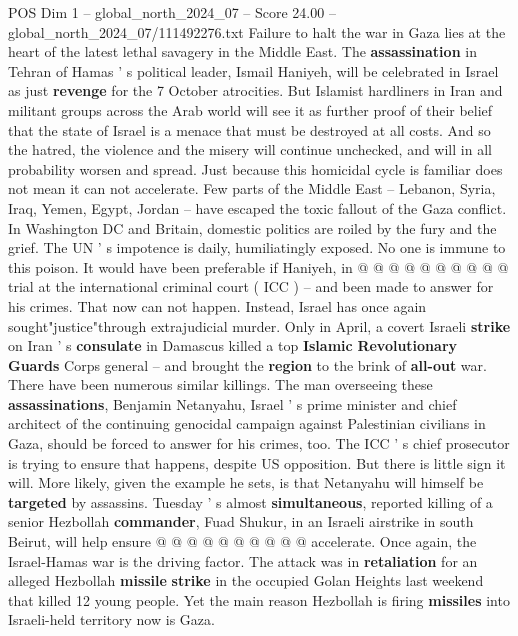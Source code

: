 \begin{textsample}{POS Dim 1 – global\_north\_2024\_07 – Score 24.00 – global\_north\_2024\_07/111492276.txt}  \label{ex:f1_pos_187}
Failure to halt the war in Gaza lies at the heart of the latest lethal savagery in the Middle East.
The \textbf{assassination} in Tehran of Hamas ' s political leader, Ismail Haniyeh, will be celebrated in Israel as just \textbf{revenge} for the 7 October atrocities.
But Islamist hardliners in Iran and militant groups across the Arab world will see it as further proof of their belief that the state of Israel is a menace that must be destroyed at all costs.
And so the hatred, the violence and the misery will continue unchecked, and will in all probability worsen and spread.
Just because this homicidal cycle is familiar does not mean it can not accelerate.
Few parts of the Middle East -- Lebanon, Syria, Iraq, Yemen, Egypt, Jordan -- have escaped the toxic fallout of the Gaza conflict.
In Washington DC and Britain, domestic politics are roiled by the fury and the grief.
The UN ' s impotence is daily, humiliatingly exposed.
No one is immune to this poison.
It would have been preferable if Haniyeh, in @ @ @ @ @ @ @ @ @ @ trial at the international criminal court ( ICC ) -- and been made to answer for his crimes.
That now can not happen.
Instead, Israel has once again sought"justice"through extrajudicial murder.
Only in April, a covert Israeli \textbf{strike} on Iran ' s \textbf{consulate} in Damascus killed a top \textbf{Islamic} \textbf{Revolutionary} \textbf{Guards} Corps general -- and brought the \textbf{region} to the brink of \textbf{all-out} war.
There have been numerous similar killings.
The man overseeing these \textbf{assassinations}, Benjamin Netanyahu, Israel ' s prime minister and chief architect of the continuing genocidal campaign against Palestinian civilians in Gaza, should be forced to answer for his crimes, too.
The ICC ' s chief prosecutor is trying to ensure that happens, despite US opposition.
But there is little sign it will.
More likely, given the example he sets, is that Netanyahu will himself be \textbf{targeted} by assassins.
Tuesday ' s almost \textbf{simultaneous}, reported killing of a senior Hezbollah \textbf{commander}, Fuad Shukur, in an Israeli airstrike in south Beirut, will help ensure @ @ @ @ @ @ @ @ @ @ accelerate.
Once again, the Israel-Hamas war is the driving factor.
The attack was in \textbf{retaliation} for an alleged Hezbollah \textbf{missile} \textbf{strike} in the occupied Golan Heights last weekend that killed 12 young people.
Yet the main reason Hezbollah is firing \textbf{missiles} into Israeli-held territory now is Gaza.

\end{textsample}

